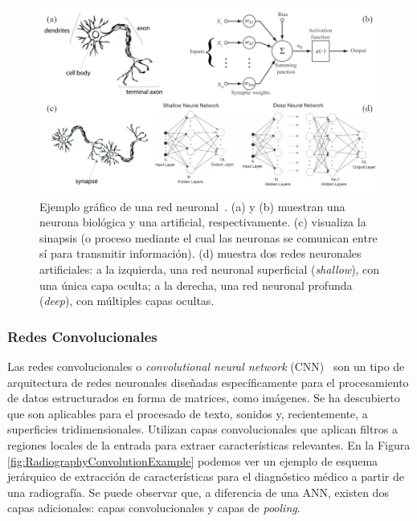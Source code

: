 \begin{figure}[htp]
  \centering
  \includegraphics[width=\textwidth]{imagenes/chapter2/ANNVisualization.png}
  \caption[Ejemplo gráfico de una red neuronal.]
  {Ejemplo gráfico de una red neuronal~\cite{NeuronImages, NeuronSimilarity,ShallowAndDeepNN}. 
    (a) y (b) muestran una neurona biológica y una artificial, respectivamente. 
    (c) visualiza la sinapsis (o proceso mediante el cual las neuronas se comunican 
    entre sí para transmitir información). (d) muestra dos redes neuronales artificiales: 
    a la izquierda, una red neuronal superficial (\emph{shallow}), con una única 
    capa oculta; a la derecha, una red neuronal profunda (\emph{deep}), con múltiples capas ocultas.
  }
  \label{fig:ANNVisualization}
\end{figure}

\subsubsection{Redes Convolucionales} 
Las redes convolucionales o \emph{convolutional neural network} (CNN)~\cite{ConvolutionalZipCode, ConvolutionInRadiology}
son un tipo de arquitectura de redes neuronales diseñadas 
específicamente para el procesamiento de datos estructurados en forma de matrices, como imágenes.
Se ha descubierto que son aplicables para el procesado de texto, sonidos y, recientemente,
a superficies tridimensionales.
Utilizan capas convolucionales que aplican filtros a regiones locales de la entrada 
para extraer características relevantes. En la Figura \ref{fig:RadiographyConvolutionExample}
podemos ver un ejemplo de esquema jerárquico de extracción de características para el 
diagnóstico médico a partir de una radiografía. Se puede observar 
que, a diferencia de una ANN, existen dos capas adicionales: capas convolucionales 
y capas de \emph{pooling}.

